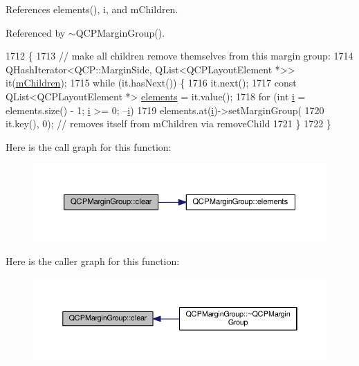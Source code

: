 References elements(), i, and m\+Children.



Referenced by $\sim$\+Q\+C\+P\+Margin\+Group().


\begin{DoxyCode}
1712                            \{
1713   \textcolor{comment}{// make all children remove themselves from this margin group:}
1714   QHashIterator<QCP::MarginSide, QList<QCPLayoutElement *>> it(\hyperlink{class_q_c_p_margin_group_ac16957e388687100bfd10f68fb7baac8}{mChildren});
1715   \textcolor{keywordflow}{while} (it.hasNext()) \{
1716     it.next();
1717     \textcolor{keyword}{const} QList<QCPLayoutElement *> \hyperlink{class_q_c_p_margin_group_a2f39e319c9ece34e0392c2ca350f1069}{elements} = it.value();
1718     \textcolor{keywordflow}{for} (\textcolor{keywordtype}{int} \hyperlink{_comparision_pictures_2_createtest_image_8m_a6f6ccfcf58b31cb6412107d9d5281426}{i} = elements.size() - 1; \hyperlink{_comparision_pictures_2_createtest_image_8m_a6f6ccfcf58b31cb6412107d9d5281426}{i} >= 0; --\hyperlink{_comparision_pictures_2_createtest_image_8m_a6f6ccfcf58b31cb6412107d9d5281426}{i})
1719       elements.at(\hyperlink{_comparision_pictures_2_createtest_image_8m_a6f6ccfcf58b31cb6412107d9d5281426}{i})->setMarginGroup(
1720           it.key(), 0); \textcolor{comment}{// removes itself from mChildren via removeChild}
1721   \}
1722 \}
\end{DoxyCode}


Here is the call graph for this function\+:\nopagebreak
\begin{figure}[H]
\begin{center}
\leavevmode
\includegraphics[width=350pt]{class_q_c_p_margin_group_a144b67f216e4e86c3a3a309e850285fe_cgraph}
\end{center}
\end{figure}




Here is the caller graph for this function\+:\nopagebreak
\begin{figure}[H]
\begin{center}
\leavevmode
\includegraphics[width=350pt]{class_q_c_p_margin_group_a144b67f216e4e86c3a3a309e850285fe_icgraph}
\end{center}
\end{figure}


